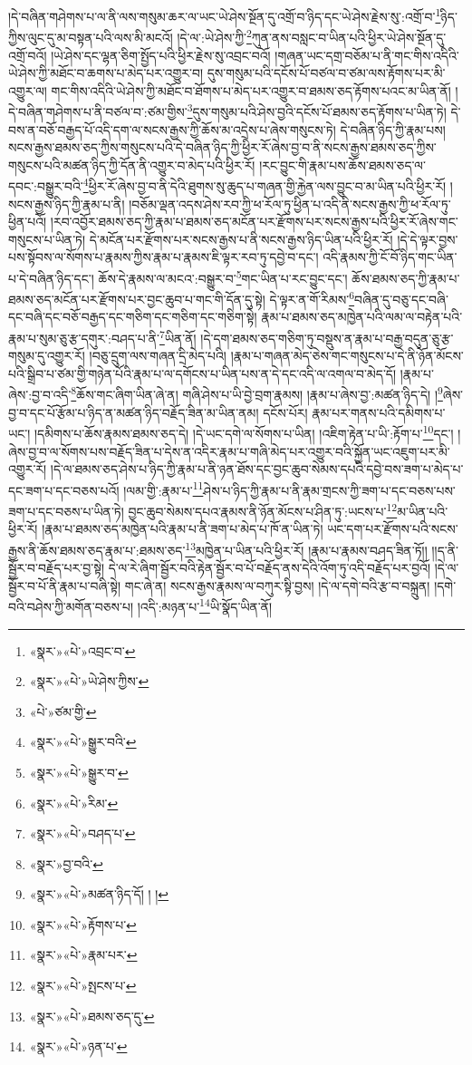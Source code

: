།དེ་བཞིན་གཤེགས་པ་ལ་ནི་ལས་གསུམ་ཆར་ལ་ཡང་ཡེ་ཤེས་སྔོན་དུ་འགྲོ་བ་ཉིད་དང་ཡེ་ཤེས་རྗེས་སུ་:འགྲོ་བ་\footnote{«སྣར་»«པེ་»འབྲང་བ་}ཉིད་ཀྱིས་ལུང་དུ་མ་བསྟན་པའི་ལས་མི་མངའོ། །དེ་ལ་:ཡེ་ཤེས་ཀྱི་\footnote{«སྣར་»«པེ་»ཡེ་ཤེས་ཀྱིས་}ཀུན་ནས་བསླང་བ་ཡིན་པའི་ཕྱིར་ཡེ་ཤེས་སྔོན་དུ་འགྲོ་བའོ། །ཡེ་ཤེས་དང་ལྷན་ཅིག་སྤྱོད་པའི་ཕྱིར་རྗེས་སུ་འབྲང་བའོ། །གཞན་ཡང་དགྲ་བཅོམ་པ་ནི་གང་གིས་འདིའི་ཡེ་ཤེས་ཀྱི་མཐོང་བ་ཆགས་པ་མེད་པར་འགྱུར་བ། དུས་གསུམ་པའི་དངོས་པོ་བཙལ་བ་ཙམ་ལས་རྟོགས་པར་མི་འགྱུར་ལ། གང་གིས་འདིའི་ཡེ་ཤེས་ཀྱི་མཐོང་བ་ཐོགས་པ་མེད་པར་འགྱུར་བ་ཐམས་ཅད་རྟོགས་པའང་མ་ཡིན་ནོ། །དེ་བཞིན་གཤེགས་པ་ནི་བཙལ་བ་:ཙམ་གྱིས་\footnote{«པེ་»ཙམ་གྱི་}དུས་གསུམ་པའི་ཤེས་བྱའི་དངོས་པོ་ཐམས་ཅད་རྟོགས་པ་ཡིན་ཏེ། དེ་བས་ན་བཅོ་བརྒྱད་པོ་འདི་དག་ལ་སངས་རྒྱས་ཀྱི་ཆོས་མ་འདྲེས་པ་ཞེས་གསུངས་ཏེ། དེ་བཞིན་ཉིད་ཀྱི་རྣམ་པས། སངས་རྒྱས་ཐམས་ཅད་ཀྱིས་གསུངས་པའི་དེ་བཞིན་ཉིད་ཀྱི་ཕྱིར་རོ་ཞེས་བྱ་བ་ནི་སངས་རྒྱས་ཐམས་ཅད་ཀྱིས་གསུངས་པའི་མཚན་ཉིད་ཀྱི་དོན་ནི་འགྱུར་བ་མེད་པའི་ཕྱིར་རོ། །རང་བྱུང་གི་རྣམ་པས་ཆོས་ཐམས་ཅད་ལ་དབང་:བསྒྱུར་བའི་\footnote{«སྣར་»«པེ་»སྒྱུར་བའི་}ཕྱིར་རོ་ཞེས་བྱ་བ་ནི་དེའི་ཐུགས་སུ་ཆུད་པ་གཞན་གྱི་རྐྱེན་ལས་བྱུང་བ་མ་ཡིན་པའི་ཕྱིར་རོ། །སངས་རྒྱས་ཉིད་ཀྱི་རྣམ་པ་ནི། །བཅོམ་ལྡན་འདས་ཤེས་རབ་ཀྱི་ཕ་རོལ་ཏུ་ཕྱིན་པ་འདི་ནི་སངས་རྒྱས་ཀྱི་ཕ་རོལ་ཏུ་ཕྱིན་པའོ། །རབ་འབྱོར་ཐམས་ཅད་ཀྱི་རྣམ་པ་ཐམས་ཅད་མངོན་པར་རྫོགས་པར་སངས་རྒྱས་པའི་ཕྱིར་རོ་ཞེས་གང་གསུངས་པ་ཡིན་ཏེ། དེ་མངོན་པར་རྫོགས་པར་སངས་རྒྱས་པ་ནི་སངས་རྒྱས་ཉིད་ཡིན་པའི་ཕྱིར་རོ། །དེ་དེ་ལྟར་བྱས་པས་སྟོབས་ལ་སོགས་པ་རྣམས་ཀྱིས་རྣམ་པ་རྣམས་ཇི་ལྟར་རབ་ཏུ་དབྱེ་བ་དང་། འདི་རྣམས་ཀྱི་ངོ་བོ་ཉིད་གང་ཡིན་པ་དེ་བཞིན་ཉིད་དང་། ཆོས་དེ་རྣམས་ལ་མངའ་:བསྒྱུར་བ་\footnote{«སྣར་»«པེ་»སྒྱུར་བ་}གང་ཡིན་པ་རང་བྱུང་དང་། ཆོས་ཐམས་ཅད་ཀྱི་རྣམ་པ་ཐམས་ཅད་མངོན་པར་རྫོགས་པར་བྱང་ཆུབ་པ་གང་གི་དོན་དུ་སྟེ། དེ་ལྟར་ན་གོ་རིམས་\footnote{«སྣར་»«པེ་»རིམ་}བཞིན་དུ་བཅུ་དང་བཞི་དང་བཞི་དང་བཅོ་བརྒྱད་དང་གཅིག་དང་གཅིག་དང་གཅིག་སྟེ། རྣམ་པ་ཐམས་ཅད་མཁྱེན་པའི་ལམ་ལ་བརྟེན་པའི་རྣམ་པ་སུམ་ཅུ་རྩ་དགུར་:བཤད་པ་ནི་\footnote{«སྣར་»«པེ་»བཤད་པ་}ཡིན་ནོ། །དེ་དག་ཐམས་ཅད་གཅིག་ཏུ་བསྡུས་ན་རྣམ་པ་བརྒྱ་བདུན་ཅུ་རྩ་གསུམ་དུ་འགྱུར་རོ། །བཅུ་དྲུག་ལས་གཞན་དྲི་མེད་པའི། །རྣམ་པ་གཞན་མེད་ཅེས་གང་གསུངས་པ་དེ་ནི་ཉོན་མོངས་པའི་སྒྲིབ་པ་ཙམ་གྱི་གཉེན་པོའི་རྣམ་པ་ལ་དགོངས་པ་ཡིན་པས་ན་དེ་དང་འདི་ལ་འགལ་བ་མེད་དོ། །རྣམ་པ་ཞེས་:བྱ་བ་འདི་\footnote{«སྣར་»བྱ་བའི་}ཆོས་གང་ཞིག་ཡིན་ཞེ་ན། གཞི་ཤེས་པ་ཡི་བྱེ་བྲག་རྣམས། །རྣམ་པ་ཞེས་བྱ་:མཚན་ཉིད་དེ། །\footnote{«སྣར་»«པེ་»མཚན་ཉིད་དོ། ། །}ཞེས་བྱ་བ་དང་པོ་རྩོམ་པ་ཉིད་ན་མཚན་ཉིད་བརྗོད་ཟིན་མ་ཡིན་ནམ། དངོས་པོར། རྣམ་པར་གནས་པའི་དམིགས་པ་ཡང་། །དམིགས་པ་ཆོས་རྣམས་ཐམས་ཅད་དེ། །དེ་ཡང་དགེ་ལ་སོགས་པ་ཡིན། །འཇིག་རྟེན་པ་ཡི་:རྟོག་པ་\footnote{«སྣར་»«པེ་»རྟོགས་པ་}དང་། །ཞེས་བྱ་བ་ལ་སོགས་པས་བརྗོད་ཟིན་པ་དེས་ན་འདིར་རྣམ་པ་གཞི་མེད་པར་འགྱུར་བའི་སྐྱོན་ཡང་འཇུག་པར་མི་འགྱུར་རོ། །དེ་ལ་ཐམས་ཅད་ཤེས་པ་ཉིད་ཀྱི་རྣམ་པ་ནི་ཉན་ཐོས་དང་བྱང་ཆུབ་སེམས་དཔའི་དབྱེ་བས་ཟག་པ་མེད་པ་དང་ཟག་པ་དང་བཅས་པའོ། །ལམ་གྱི་:རྣམ་པ་\footnote{«སྣར་»«པེ་»རྣམ་པར་}ཤེས་པ་ཉིད་ཀྱི་རྣམ་པ་ནི་རྣམ་གྲངས་ཀྱི་ཟག་པ་དང་བཅས་པས་ཟག་པ་དང་བཅས་པ་ཡིན་ཏེ། བྱང་ཆུབ་སེམས་དཔའ་རྣམས་ནི་ཉོན་མོངས་པ་ཤིན་ཏུ་:ཡངས་པ་\footnote{«སྣར་»«པེ་»སྤངས་པ་}མ་ཡིན་པའི་ཕྱིར་རོ། །རྣམ་པ་ཐམས་ཅད་མཁྱེན་པའི་རྣམ་པ་ནི་ཟག་པ་མེད་པ་ཁོ་ན་ཡིན་ཏེ། ཡང་དག་པར་རྫོགས་པའི་སངས་རྒྱས་ནི་ཆོས་ཐམས་ཅད་རྣམ་པ་:ཐམས་ཅད་\footnote{«སྣར་»«པེ་»ཐམས་ཅད་དུ་}མཁྱེན་པ་ཡིན་པའི་ཕྱིར་རོ། །རྣམ་པ་རྣམས་བཤད་ཟིན་ཏོ།། །།ད་ནི་སྦྱོར་བ་བརྗོད་པར་བྱ་སྟེ། དེ་ལ་རེ་ཞིག་སྦྱོར་བའི་རྟེན་སྦྱོར་བ་པོ་བརྗོད་ནས་དེའི་འོག་ཏུ་འདི་བརྗོད་པར་བྱའོ། །དེ་ལ་སྦྱོར་བ་པོ་ནི་རྣམ་པ་བཞི་སྟེ། གང་ཞེ་ན། སངས་རྒྱས་རྣམས་ལ་བཀུར་སྟི་བྱས། །དེ་ལ་དགེ་བའི་རྩ་བ་བསྐྲུན། །དགེ་བའི་བཤེས་ཀྱི་མགོན་བཅས་པ། །འདི་:མཉན་པ་\footnote{«སྣར་»«པེ་»ཉན་པ་}ཡི་སྣོད་ཡིན་ནོ། 
